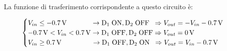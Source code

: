 \documentclass{report}
\begin{document}
\\La funzione di trasferimento corrispondente a questo circuito è:

\begin{equation}
   \begin{cases}
   V_{in}\le \SI{-0.7}{\volt}\;\;\indent\indent\rightarrow \mathrm{D_1\; ON, D_2\;OFF}\;\; \Rightarrow V_{out} = -V_{in}-\SI{0.7}{\volt}\\
  \SI{-0.7}{\volt} < V_{in}< \SI{0.7}{\volt}\rightarrow \mathrm{D_1\; OFF, D_2\;OFF} \Rightarrow V_{out} = \SI{0}{\volt}\\
   V_{in}\ge \SI{0.7}{\volt}\;\;\;\;\;\indent\indent\rightarrow \mathrm{D_1\; OFF, D_2\;ON}\;\; \Rightarrow V_{out} = V_{in}-\SI{0.7}{\volt}
   \end{cases}
\end{equation}
\end{document}
